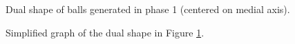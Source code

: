 \documentclass[11pt]{article}
\begin{document}
\begin{figure}
	\caption{\label{ourdualshape}} Dual shape of balls generated in phase 1 (centered on medial axis).
\end{figure}

\begin{figure}
	\caption{\label{simplifiedgraph}} Simplified graph of the dual shape in Figure \ref{ourdualshape}.
\end{figure}
\end{document}
